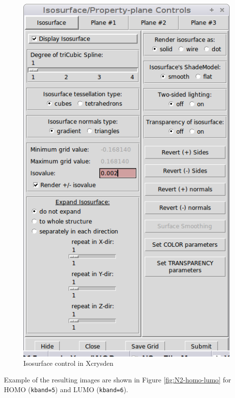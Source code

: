 \documentclass[12pt,english]{paper}
\begin{document}
\begin{figure}[H]
\noindent \begin{centering}
\includegraphics[scale=0.3]{images/IsosurfaceWindow}
\par\end{centering}

\caption{Isosurface control in Xcrysden \label{fig:dia4}}
\end{figure}


Example of the resulting images are shown in Figure \ref{fig:N2-homo-lumo}
for HOMO (\texttt{kband=5}) and LUMO (\texttt{kband=6}).
\end{document}
